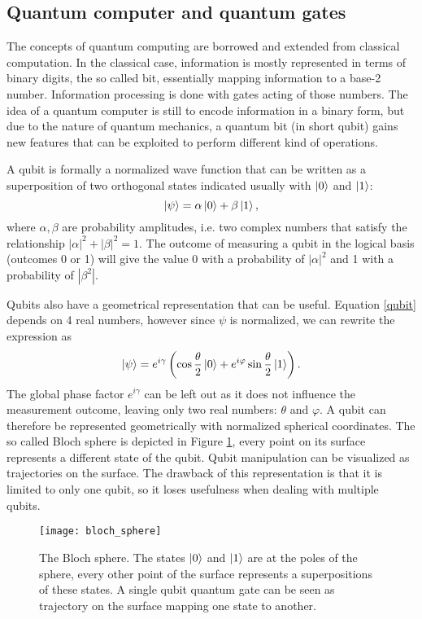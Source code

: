 \subsection{Quantum computer and quantum gates}
\label{sec:quantumoperations}
The concepts of quantum computing are borrowed and extended from classical computation. In the classical case, information is mostly represented in terms of binary digits, the so called bit, essentially mapping information to a base-2 number. Information processing is done with gates acting of those numbers. The idea of a quantum computer is still to encode information in a binary form, but due to the nature of quantum mechanics, a quantum bit (in short qubit) gains new features that can be exploited to perform different kind of operations.\par
A qubit is formally a normalized wave function that can be written as a superposition of two orthogonal states indicated usually with $\ket{0}$ and $\ket{1}$:
\begin{equation}
\label{qubit}
\ket{\psi} = \alpha \ket{0} + \beta\ket{1},
\end{equation}
where $\alpha,\beta$ are probability amplitudes, i.e. two complex numbers that satisfy the relationship $|\alpha|^2+|\beta|^2 = 1$. The outcome of measuring a qubit in the logical basis (outcomes 0 or 1) will give the value 0 with a probability of $|\alpha|^2$ and 1 with a probability of $|\beta^2|$.\par
Qubits also have a geometrical representation that can be useful. Equation \eqref{qubit} depends on 4 real numbers, however since $\psi$ is normalized, we can rewrite the expression as \cite{chuang}
\begin{equation}
\ket{\psi} = e^{i\gamma}\left(\cos\frac{\theta}{2}\ket{0} + e^{i\varphi}\sin\frac{\theta}{2}\ket{1}\right).
\end{equation}
The global phase factor $e^{i\gamma}$ can be left out as it does not influence the measurement outcome, leaving only two real numbers: $\theta$ and $\varphi$. A qubit can therefore be represented geometrically with normalized spherical coordinates. The so called Bloch sphere is depicted in Figure \ref{blochsphere}, every point on its surface represents a different state of the qubit. Qubit manipulation can be visualized as trajectories on the surface. The drawback of this representation is that it is limited to only one qubit, so it loses usefulness when dealing with multiple qubits.
\begin{figure}[H]
\centering
\texttt{[image: bloch\_sphere]}
\caption{The Bloch sphere. The states $\ket{0}$ and $\ket{1}$ are at the poles of the sphere, every other point of the surface represents a superpositions of these states. A single qubit quantum gate can be seen as trajectory on the surface mapping one state to another.}
\label{blochsphere}
\end{figure}

